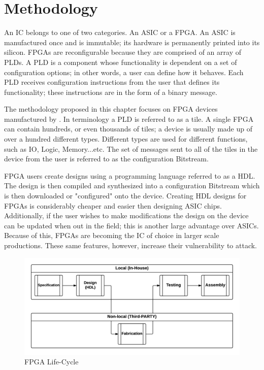 \label{chapter:trojanDetection}

\section{Methodology} \label{sec:methodology}
An \acrfull{IC} belongs to one of two categories.
An \acrfull{ASIC} or a \acrfull{FPGA}.
An \acrshort{ASIC} is manufactured once and is immutable; its hardware is permanently printed into its silicon.
\acrshort{FPGA}s are reconfigurable because they are comprised of an array of \acrfull{PLDs}.
A \acrshort{PLD} is a component whose functionality is dependent on a set of configuration options; in other words, a user can define how it behaves.
Each \acrshort{PLD} receives configuration instructions from the user that defines its functionality; these instructions are in the form of a binary message.

The methodology proposed in this chapter focuses on \acrshort{FPGA} devices manufactured by \Xilinx.
In \Xilinx terminology a \acrshort{PLD} is referred to as a tile. 
A single \acrshort{FPGA} can contain hundreds, or even thousands of tiles; a device is usually made up of over a hundred different types.
Different types are used for different functions, such as \acrfull{IO}, Logic, Memory...etc.
The set of messages sent to all of the tiles in the device from the user is referred to as the configuration \gls{Bitstream}. 

\acrshort{FPGA} users create designs using a programming language referred to as a \acrfull{HDL}.
The design is then compiled and synthesized into a configuration \gls{Bitstream} which is then downloaded or "configured" onto the device.
Creating \acrshort{HDL} designs for \acrshort{FPGA}s is considerably cheaper and easier then designing \acrshort{ASIC} chips.
Additionally, if the user wishes to make modifications the design on the device can be updated when out in the field; this is another large advantage over \acrshort{ASIC}s.
Because of this, \acrshort{FPGA}s are becoming the \acrshort{IC} of choice in larger scale productions.
These same features, however, increase their vulnerability to attack.
\begin{figure}[h]
	\centering
	\includegraphics[width=1\linewidth]{figures/Concept}
	\caption[FPGA Life-Cycle]{FPGA Life-Cycle}
	\label{fig:Concept}
\end{figure}

